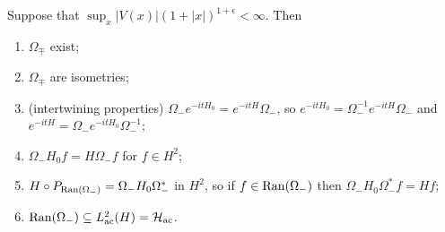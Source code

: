 \begin{theorem}\label{thm:wave-op-properties}
  Suppose that $\sup_x |V(x)| (1 + |x|)^{1 + \epsilon} < \infty$. Then
  \begin{enumerate}
    \item $\Omega_{\mp}$ exist;
    \item $\Omega_{\mp}$ are isometries;
    \item (intertwining properties)
      $\Omega_- e^{-itH_0} = e^{-itH} \Omega_-$, so
      $e^{-itH_0} = \Omega_-^{-1} e^{-itH} \Omega_-$
      and $e^{-itH} = \Omega_- e^{-itH_0} \Omega_-^{-1}$;
    \item $\Omega_- H_0 f = H \Omega_- f$
      for $f \in H^2$;
    \item $H \circ P_{\operatorname{Ran}(\Omega_-)} = \Omega_- H_0 \Omega_-^*$
      in $H^2$, so if
      $f \in \operatorname{Ran}(\Omega_-)$ then $\Omega_- H_0 \Omega_-^* f = Hf$;
    \item $\operatorname{Ran}(\Omega_-) \subseteq L^2_{\mathrm{ac}}(H) = \mathcal{H}_{\mathrm{ac}}$.
  \end{enumerate}
\end{theorem}

